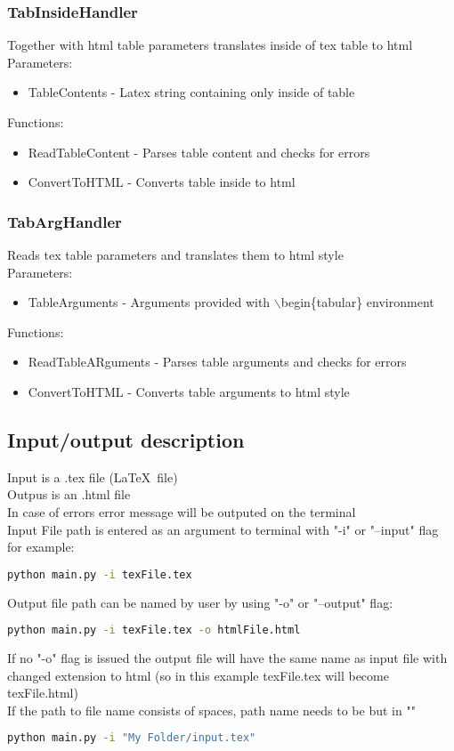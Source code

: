 \documentclass[12pt]{article}
\begin{document}
\subsubsection{TabInsideHandler}
Together with html table parameters translates inside of tex table to html  \\ 
Parameters: \\ 
\begin{itemize}
\item TableContents - Latex string containing only inside of table
\end{itemize}
Functions: 
\begin{itemize}
    \item ReadTableContent - Parses table content and checks for errors 
    \item ConvertToHTML - Converts table inside to html
\end{itemize}

\subsubsection{TabArgHandler}
Reads tex table parameters and translates them to html style  \\ 
Parameters: \\ 
\begin{itemize}
\item TableArguments - Arguments provided with $\backslash$begin\{tabular\} environment
\end{itemize}
Functions: 
\begin{itemize}
    \item ReadTableARguments - Parses table arguments and checks for errors 
    \item ConvertToHTML - Converts table arguments to html style
\end{itemize}

\subsection{Input/output description}
Input is a .tex file (\LaTeX \, file) \\ 
Outpus is an .html file \\ 
In case of errors error message will be outputed on the terminal \\
Input File path is entered as an argument to terminal with "-i" or "--input" flag for example:
\begin{lstlisting}[language=bash]
python main.py -i texFile.tex
\end{lstlisting}
Output file path can be named by user by using "-o" or "--output" flag:
\begin{lstlisting}[language=bash]
python main.py -i texFile.tex -o htmlFile.html
\end{lstlisting}
If no "-o" flag is issued the output file will have the same name as input file with changed extension to html (so in this example texFile.tex will become texFile.html) \\ 
If the path to file name consists of spaces, path name needs to be but in ""
\begin{lstlisting}[language=bash]
python main.py -i "My Folder/input.tex"
\end{lstlisting}
\end{document}
